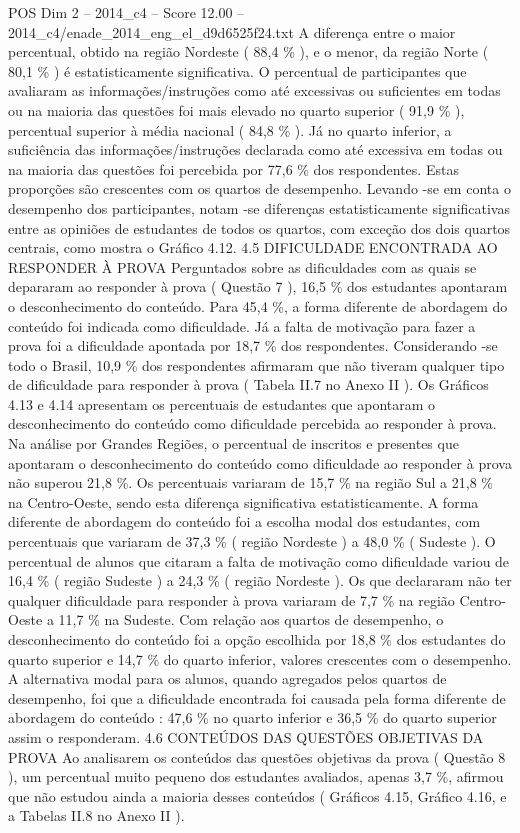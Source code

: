 \begin{textsample}{POS Dim 2 – 2014\_c4 – Score 12.00 – 2014\_c4/enade\_2014\_eng\_el\_d9d6525f24.txt}
A diferença entre o maior percentual, obtido na região Nordeste ( 88,4 \% ), e o menor, da região Norte ( 80,1 \% ) é estatisticamente significativa.
O percentual de participantes que avaliaram as informações/instruções como até excessivas ou suficientes em todas ou na maioria das questões foi mais elevado no quarto superior ( 91,9 \% ), percentual superior à média nacional ( 84,8 \% ).
Já no quarto inferior, a suficiência das informações/instruções declarada como até excessiva em todas ou na maioria das questões foi percebida por 77,6 \% dos respondentes.
Estas proporções são crescentes com os quartos de desempenho.
Levando -se em conta o desempenho dos participantes, notam -se diferenças estatisticamente significativas entre as opiniões de estudantes de todos os quartos, com exceção dos dois quartos centrais, como mostra o Gráfico 4.12. 4.5 DIFICULDADE ENCONTRADA AO RESPONDER À PROVA Perguntados sobre as dificuldades com as quais se depararam ao responder à prova ( Questão 7 ), 16,5 \% dos estudantes apontaram o desconhecimento do conteúdo.
Para 45,4 \%, a forma diferente de abordagem do conteúdo foi indicada como dificuldade.
Já a falta de motivação para fazer a prova foi a dificuldade apontada por 18,7 \% dos respondentes.
Considerando -se todo o Brasil, 10,9 \% dos respondentes afirmaram que não tiveram qualquer tipo de dificuldade para responder à prova ( Tabela II.7 no Anexo II ).
Os Gráficos 4.13 e 4.14 apresentam os percentuais de estudantes que apontaram o desconhecimento do conteúdo como dificuldade percebida ao responder à prova.
Na análise por Grandes Regiões, o percentual de inscritos e presentes que apontaram o desconhecimento do conteúdo como dificuldade ao responder à prova não superou 21,8 \%.
Os percentuais variaram de 15,7 \% na região Sul a 21,8 \% na Centro-Oeste, sendo esta diferença significativa estatisticamente.
A forma diferente de abordagem do conteúdo foi a escolha modal dos estudantes, com percentuais que variaram de 37,3 \% ( região Nordeste ) a 48,0 \% ( Sudeste ).
O percentual de alunos que citaram a falta de motivação como dificuldade variou de 16,4 \% ( região Sudeste ) a 24,3 \% ( região Nordeste ).
Os que declararam não ter qualquer dificuldade para responder à prova variaram de 7,7 \% na região Centro-Oeste a 11,7 \% na Sudeste.
Com relação aos quartos de desempenho, o desconhecimento do conteúdo foi a opção escolhida por 18,8 \% dos estudantes do quarto superior e 14,7 \% do quarto inferior, valores crescentes com o desempenho.
A alternativa modal para os alunos, quando agregados pelos quartos de desempenho, foi que a dificuldade encontrada foi causada pela forma diferente de abordagem do conteúdo : 47,6 \% no quarto inferior e 36,5 \% do quarto superior assim o responderam. 4.6 CONTEÚDOS DAS QUESTÕES OBJETIVAS DA PROVA Ao analisarem os conteúdos das questões objetivas da prova ( Questão 8 ), um percentual muito pequeno dos estudantes avaliados, apenas 3,7 \%, afirmou que não estudou ainda a maioria desses conteúdos ( Gráficos 4.15, Gráfico 4.16, e a Tabelas II.8 no Anexo II ).

\end{textsample}
